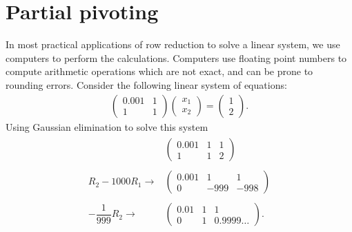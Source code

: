 \documentclass[letterpaper,10pt,english]{jupyterBook}
\begin{document}
\section{Partial pivoting}
\label{\detokenize{_pages/2.4_Partial_pivoting:partial-pivoting}}\label{\detokenize{_pages/2.4_Partial_pivoting:index-0}}\label{\detokenize{_pages/2.4_Partial_pivoting:partial-pivoting-section}}\label{\detokenize{_pages/2.4_Partial_pivoting::doc}}
\sphinxAtStartPar
In most practical applications of row reduction to solve a linear system, we use computers to perform the calculations. Computers use floating point numbers to compute arithmetic operations \sphinxhyphen{} which are not exact, and can be prone to rounding errors. Consider the following linear system of equations:
\begin{equation*}
\begin{split} \begin{pmatrix}0.001 & 1 \\ 1 & 1 \end{pmatrix}
\begin{pmatrix} x_1 \\ x_2 \end{pmatrix} =
\begin{pmatrix}1 \\ 2 \end{pmatrix}. \end{split}
\end{equation*}
\sphinxAtStartPar
Using Gaussian elimination to solve this system
\begin{equation*}
\begin{split} \begin{align*}
    & \left( \begin{array}{cc|c}
        0.001 & 1 & 1 \\
        1 & 1 & 2
    \end{array} \right)
    \\ \\
     R_2 - 1000R_1 \longrightarrow &
    \left( \begin{array}{cc|c}
        0.001 & 1 & 1 \\
        0 & -999 & -998
    \end{array} \right)
    \\ \\
    -\dfrac{1}{999}R_2 \longrightarrow &
    \left( \begin{array}{cc|c}
        0.01 & 1 & 1 \\
        0 & 1 & 0.9999\ldots
    \end{array} \right).
\end{align*} \end{split}
\end{equation*}
\end{document}
